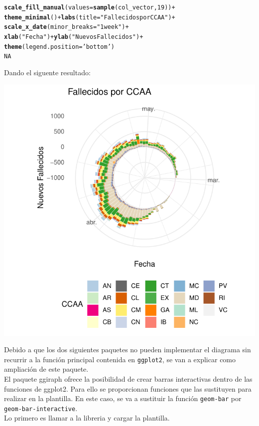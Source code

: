 \documentclass{article}\usepackage[]{graphicx}\usepackage[]{color}
\makeatletter
\def\maxwidth{ %
  \ifdim\Gin@nat@width>\linewidth
    \linewidth
  \else
    \Gin@nat@width
  \fi
}
\newcommand{\hlnum}[1]{\textcolor[rgb]{0.686,0.059,0.569}{#1}}%
\newcommand{\hlstr}[1]{\textcolor[rgb]{0.192,0.494,0.8}{#1}}%
\newcommand{\hlopt}[1]{\textcolor[rgb]{0,0,0}{#1}}%
\newcommand{\hlstd}[1]{\textcolor[rgb]{0.345,0.345,0.345}{#1}}%
\newcommand{\hlkwc}[1]{\textcolor[rgb]{0.333,0.667,0.333}{#1}}%
\newcommand{\hlkwd}[1]{\textcolor[rgb]{0.737,0.353,0.396}{\textbf{#1}}}%
\newenvironment{kframe}{%
 \def\at@end@of@kframe{}%
 \ifinner\ifhmode%
  \def\at@end@of@kframe{\end{minipage}}%
  \begin{minipage}{\columnwidth}%
 \fi\fi%
 \def\FrameCommand##1{\hskip\@totalleftmargin \hskip-\fboxsep
 \colorbox{shadecolor}{##1}\hskip-\fboxsep
     \hskip-\linewidth \hskip-\@totalleftmargin \hskip\columnwidth}%
 \MakeFramed {\advance\hsize-\width
   \@totalleftmargin\z@ \linewidth\hsize
   \@setminipage}}%
 {\par\unskip\endMakeFramed%
 \at@end@of@kframe}
\newenvironment{knitrout}{}{} %
\makeatother
\begin{document}
\begin{knitrout}
\color{fgcolor}\begin{kframe}
\begin{alltt}
  \hlkwd{scale_fill_manual}\hlstd{(}\hlkwc{values} \hlstd{=} \hlkwd{sample}\hlstd{(col_vector,} \hlnum{19}\hlstd{))} \hlopt{+}
  \hlkwd{theme_minimal}\hlstd{()} \hlopt{+} \hlkwd{labs}\hlstd{(}\hlkwc{title} \hlstd{=} \hlstr{"Fallecidos por CCAA"}\hlstd{)} \hlopt{+}
  \hlkwd{scale_x_date}\hlstd{(}\hlkwc{minor_breaks} \hlstd{=} \hlstr{"1 week"}\hlstd{)} \hlopt{+}
  \hlkwd{xlab}\hlstd{(}\hlstr{"Fecha"}\hlstd{)}\hlopt{+}\hlkwd{ylab}\hlstd{(}\hlstr{"Nuevos Fallecidos"}\hlstd{)}\hlopt{+}
  \hlkwd{theme}\hlstd{(}\hlkwc{legend.position} \hlstd{=} \hlstr{'bottom'}\hlstd{)}
\hlnum{NA}
\end{alltt}
\end{kframe}
\end{knitrout}
Dando el siguente resultado:
\begin{knitrout}
\color{fgcolor}

{\centering \includegraphics[width=\maxwidth]{figure/plot_col_sep_gg-1} 

}



\end{knitrout}
\clearpage
Debido a que los dos siguientes paquetes no pueden implementar el diagrama sin recurrir a la funci\'on principal contenida en \texttt{ggplot2}, se van a explicar como ampliaci\'on de este paquete.~\\
El paquete ggiraph\cite{docu_ggiraph} ofrece la posibilidad de crear barras interactivas dentro de las funciones de ggplot2. Para ello se proporcionan funciones que las sustituyen para realizar en la plantilla. En este caso, se va a sustituir la funci\'on \texttt{geom-bar} por \texttt{geom-bar-interactive}.~\\
Lo primero es llamar a la libreria y cargar la plantilla.
\end{document}
